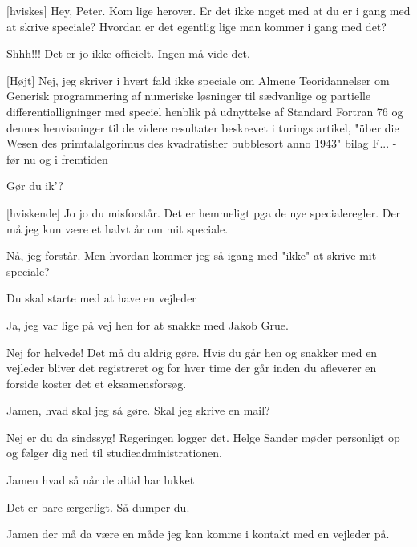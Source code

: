\documentclass[a4paper,11pt]{article}
\begin{document}
  
\begin{sketch}


 [hviskes] Hey, Peter. Kom lige herover. Er det ikke noget
med at du er i gang med at skrive speciale? Hvordan er det egentlig lige man kommer i gang med det?

 Shhh!!! Det er jo ikke officielt. Ingen må vide det.

[Højt] Nej, jeg skriver i hvert fald ikke speciale om Almene
Teoridannelser om Generisk programmering af numeriske løsninger til
sædvanlige og partielle differentialligninger med speciel henblik på
udnyttelse af Standard Fortran 76 og dennes henvisninger til de videre
resultater beskrevet i turings artikel, "über die Wesen des
primtalalgorimus des kvadratisher bubblesort anno 1943" bilag F... -
før nu og i fremtiden

 Gør du ik'?

 [hviskende] Jo jo du misforstår. Det er hemmeligt pga de nye specialeregler.
Der må jeg kun være et halvt år om mit speciale.

 Nå, jeg forstår. Men hvordan kommer jeg så igang med "ikke"
at skrive mit speciale?

 Du skal starte med at have en vejleder

 Ja, jeg var lige på vej hen for at snakke med Jakob Grue.

 Nej for helvede! Det må du aldrig gøre. Hvis du går hen og
snakker med en vejleder bliver det registreret og for hver time der
går inden du afleverer en forside koster det et eksamensforsøg.

 Jamen, hvad skal jeg så gøre. Skal jeg skrive en mail?

 Nej er du da sindssyg! Regeringen logger det. Helge Sander
møder personligt op og følger dig ned til studieadministrationen.

 Jamen hvad så når de altid har lukket

 Det er bare ærgerligt. Så dumper du.

 Jamen der må da være en måde jeg kan komme i kontakt med en vejleder på.


\end{sketch}
\end{document}
